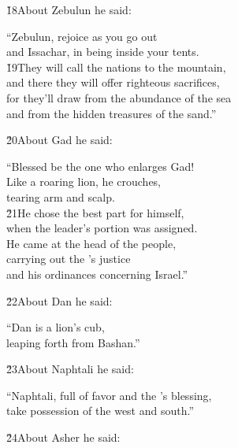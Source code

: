 \v{18}About Zebulun he said:

\begin{poetry}
\poeml ``Zebulun, rejoice as you go out \\
\poemll    and Issachar, in being inside your tents. \\
\poeml \v{19}They will call the nations to the mountain, \\
\poemll    and there they will offer righteous sacrifices, \\
\poeml for they'll draw from the abundance of the sea \\
\poemll    and from the hidden treasures of the sand.''
\end{poetry}

\v{20}About Gad he said:

\begin{poetry}
\poeml ``Blessed be the one who enlarges Gad! \\
\poemll    Like a roaring lion, he crouches, \\
\poemlll       tearing arm and scalp. \\
\poeml \v{21}He chose the best part for himself, \\
\poemll    when the leader's portion was assigned. \\
\poeml He came at the head of the people, \\
\poemll    carrying out the 's justice \\
\poemlll       and his ordinances concerning Israel.''
\end{poetry}

\v{22}About Dan he said:

\begin{poetry}
\poeml ``Dan is a lion's cub, \\
\poemll    leaping forth from Bashan.''
\end{poetry}

\v{23}About Naphtali he said:

\begin{poetry}
\poeml ``Naphtali, full of favor and the 's blessing, \\
\poemll    take possession of the west and south.''
\end{poetry}

\v{24}About Asher he said:

